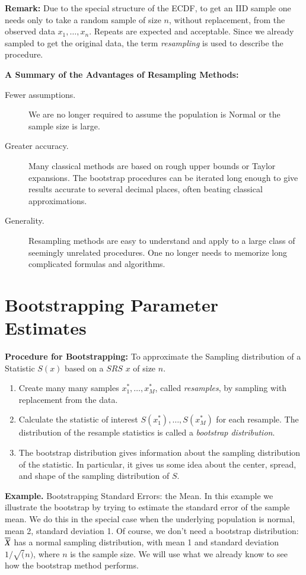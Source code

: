 \documentclass[captions=tableheading]{scrbook}
\begin{document}
\textbf{Remark:} Due to the special structure of the ECDF, to get an IID sample one needs only to take a random sample of size $n$, without replacement, from the observed data $x_{1},\ldots,x_{n}$. Repeats are expected and acceptable. Since we already sampled to get the original data, the term \emph{resampling} is used to describe the procedure.

\textbf{A Summary of the Advantages of Resampling Methods:}


\begin{description}
\item[Fewer assumptions.] We are no longer required to assume the population is Normal or the sample size is large.
\item[Greater accuracy.] Many classical methods are based on rough upper bounds or Taylor expansions. The bootstrap procedures can be iterated long enough to give results accurate to several decimal places, often beating classical approximations.
\item[Generality.] Resampling methods are easy to understand and apply to a large class of seemingly unrelated procedures. One no longer needs to memorize long complicated formulas and algorithms.
\end{description}
\section{Bootstrapping Parameter Estimates}
\label{sec-4_2}


\textbf{Procedure for Bootstrapping:} To approximate the Sampling distribution of a Statistic $S(x)$ based on a $SRS$ $x$ of size $n$.


\begin{enumerate}
\item Create many many samples $x_{1}^{\ast},\ldots,x_{M}^{\ast}$, called \emph{resamples}, by sampling with replacement from the data.
\item Calculate the statistic of interest $S(x_{1}^{\ast}),\ldots,S(x_{M}^{\ast})$ for each resample. The distribution of the resample statistics is called a \emph{bootstrap distribution}.
\item The bootstrap distribution gives information about the sampling distribution of the statistic. In particular, it gives us some idea about the center, spread, and shape of the sampling distribution of $S$.
\end{enumerate}

\textbf{Example.} Bootstrapping Standard Errors: the Mean.  In this example we illustrate the bootstrap by trying to estimate the standard error of the sample mean. We do this in the special case when the underlying population is normal, mean 2, standard deviation 1. Of course, we don't need a bootstrap distribution: $\overline{X}$ has a normal sampling distribution, with mean 1 and standard deviation $1/\sqrt{(}n)$, where $n$ is the sample size. We will use what we already know to see how the bootstrap method performs.
\end{document}

